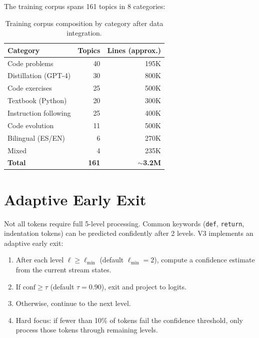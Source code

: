 \documentclass[11pt,a4paper]{article}
\begin{document}
The training corpus spans 161 topics in 8 categories:

\begin{table}[h]
\centering
\small
\begin{tabular}{lrr}
\toprule
\textbf{Category} & \textbf{Topics} & \textbf{Lines (approx.)}\\
\midrule
Code problems         & 40  & 195K  \\
Distillation (GPT-4)  & 30  & 800K  \\
Code exercises        & 25  & 500K  \\
Textbook (Python)     & 20  & 300K  \\
Instruction following & 25  & 400K  \\
Code evolution        & 11  & 500K  \\
Bilingual (ES/EN)     & 6   & 270K  \\
Mixed                 & 4   & 235K  \\
\midrule
\textbf{Total}        & \textbf{161} & \textbf{$\sim$3.2M}\\
\bottomrule
\end{tabular}
\caption{Training corpus composition by category after data integration.}
\label{tab:data}
\end{table}

\section{Adaptive Early Exit}
\label{sec:early_exit}

Not all tokens require full 5-level processing.  Common keywords (\texttt{def},
\texttt{return}, indentation tokens) can be predicted confidently after 2
levels.  V3 implements an adaptive early exit:

\begin{enumerate}
    \item After each level $\ell \geq \ell_\text{min}$ (default $\ell_\text{min}=2$),
    compute a confidence estimate from the current stream states.
    \item If $\text{conf} \geq \tau$ (default $\tau=0.90$), exit and project
    to logits.
    \item Otherwise, continue to the next level.
    \item Hard focus: if fewer than 10\% of tokens fail the confidence
    threshold, only process those tokens through remaining levels.
\end{enumerate}
\end{document}
